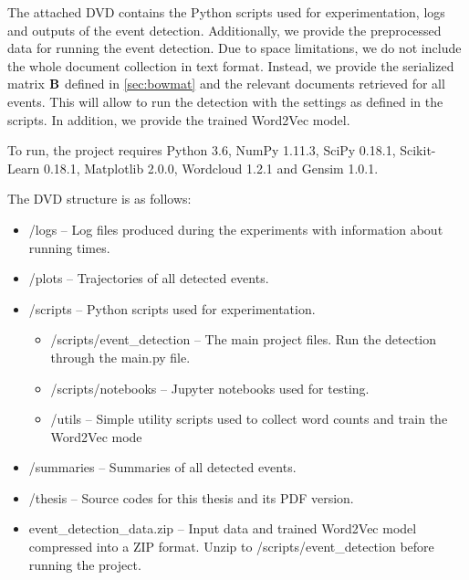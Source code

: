 The attached DVD contains the Python scripts used for experimentation, logs and outputs of the event detection. Additionally, we provide the preprocessed data for running the event detection. Due to space limitations, we do not include the whole document collection in text format. Instead, we provide the serialized matrix $\mathbf{B}$ defined in \autoref{sec:bowmat} and the relevant documents retrieved for all events. This will allow to run the detection with the settings as defined in the scripts. In addition, we provide the trained Word2Vec model.

To run, the project requires Python 3.6, NumPy 1.11.3, SciPy 0.18.1, Scikit-Learn 0.18.1, Matplotlib 2.0.0, Wordcloud 1.2.1 and Gensim 1.0.1.

The DVD structure is as follows:

\begin{itemize}
	\item /logs -- Log files produced during the experiments with information about running times.
	\item /plots -- Trajectories of all detected events.
	\item /scripts -- Python scripts used for experimentation.
		\begin{itemize}
			\item /scripts/event\_detection -- The main project files. Run the detection through the main.py file.
			\item /scripts/notebooks -- Jupyter notebooks used for testing.
			\item /utils -- Simple utility scripts used to collect word counts and train the Word2Vec mode
		\end{itemize}
	\item /summaries -- Summaries of all detected events.
	\item /thesis -- Source codes for this thesis and its PDF version.
	\item event\_detection\_data.zip -- Input data and trained Word2Vec model compressed into a ZIP format. Unzip to /scripts/event\_detection before running the project.
\end{itemize}